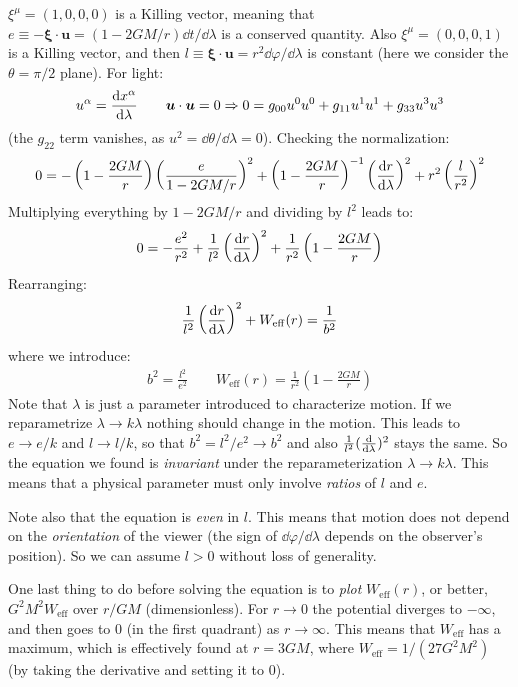 \documentclass[../template.tex]{subfiles}
\begin{document}
$\xi^\mu = (1,0,0,0)$ is a Killing vector, meaning that $e\equiv -\bm{\xi}\cdot \bm{u} = (1- 2GM/r) \dd{t}/\dd{\lambda}$ is a conserved quantity. Also $\xi^\mu = (0,0,0,1)$ is a Killing vector, and then $l \equiv \bm{\xi} \cdot \bm{u} = r^2 \dd{\varphi}/\dd{\lambda}$ is constant (here we consider the $\theta = \pi/2$ plane). For light:
\begin{align*}
    u^\alpha = \dv{x^\alpha}{\lambda} \qquad \bm{u}\cdot \bm{u} = 0 \Rightarrow 0 = g_{00} u^0 u^0 + g_{11} u^1 u^1 + g_{33} u^3 u^3
\end{align*}   
(the $g_{22} $ term vanishes, as $u^2 = \dd{\theta}/\dd{\lambda} = 0$). Checking the normalization:
\begin{align*}
    0 = -\left(1-\frac{2GM}{r} \right)\left(\frac{e}{1-2GM/r} \right)^2 + \left(1-\frac{2GM}{r} \right)^{-1} \left(\dv{r}{\lambda}\right)^2 + r^2 \left(\frac{l}{r^2} \right)^2
\end{align*}
Multiplying everything by $1-2GM/r$ and dividing by $l^2$  leads to:
\begin{align*}
    0 = -\frac{e^2}{r^2} + \frac{1}{l^2} \left(\dv{r}{\lambda}\right)^2 + \frac{1}{r^2} \left(1-\frac{2GM}{r} \right)   
\end{align*} 
Rearranging:
\begin{align*}
    \frac{1}{l^2} \left(\dv{r}{\lambda}\right)^2 + W_{\mathrm{eff} }(r) = \frac{1}{b^2}  
\end{align*}
where we introduce:
\begin{align*}
    b^2 = \frac{l^2}{e^2} \qquad W_{\mathrm{eff} }(r) = \frac{1}{r^2}\left(1-\frac{2GM}{r} \right)  
\end{align*}
Note that $\lambda$ is just a parameter introduced  to characterize motion. If we reparametrize $\lambda \to k \lambda$ nothing should change in the motion. This leads to $e \to e/k$ and $l \to l/k$, so that $b^2 = l^2/e^2 \to b^2 $ and also $\frac{1}{l^2} (\dv{\lambda})^2$ stays the same. So the equation we found is \textit{invariant} under the reparameterization $\lambda \to k \lambda$. This means that a physical parameter must only involve \textit{ratios} of $l$ and $e$.

Note also that the equation is \textit{even} in $l$. This means that motion does not depend on the \textit{orientation} of the viewer (the sign of $\dd{\varphi}/\dd{\lambda}$ depends on the observer's position). So we can assume $l>0$ without loss of generality.

One last thing to do before solving the equation is to \textit{plot} $W_{\mathrm{eff} }(r)$, or better, $G^2M^2 W_{\mathrm{eff} }$ over $r/GM$ (dimensionless). For $r \to 0$ the potential diverges to $-\infty$, and then goes to $0$ (in the first quadrant) as $r \to \infty$. This means that $W_{\mathrm{eff} }$ has a maximum, which is effectively found at $r= 3GM$, where $W_{\mathrm{eff} } = 1/(27 G^2 M^2)$ (by taking the derivative and setting it to $0$).
\end{document}
